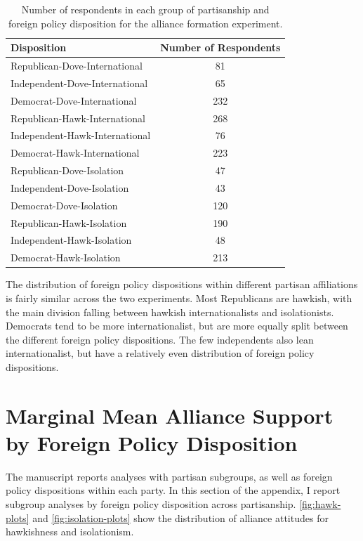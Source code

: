 \documentclass[12pt]{article}
\begin{document}
\begin{table}[htbp]
\centering
\begin{tabular}{lc}
  \hline
 Disposition  & Number of Respondents \\ 
  \hline
Republican-Dove-International &  81 \\ 
  Independent-Dove-International &  65 \\ 
  Democrat-Dove-International & 232 \\ 
  Republican-Hawk-International & 268 \\ 
  Independent-Hawk-International &  76 \\ 
  Democrat-Hawk-International & 223 \\ 
  Republican-Dove-Isolation &  47 \\ 
  Independent-Dove-Isolation &  43 \\ 
  Democrat-Dove-Isolation & 120 \\ 
  Republican-Hawk-Isolation & 190 \\ 
  Independent-Hawk-Isolation &  48 \\ 
  Democrat-Hawk-Isolation & 213 \\ 
   \hline
\end{tabular}
\caption{Number of respondents in each group of partisanship 
               and foreign policy disposition for the alliance formation experiment.} 
\label{tab:party-dispo-form}
\end{table}


The distribution of foreign policy dispositions within different partisan affiliations is fairly similar across the two experiments. 
Most Republicans are hawkish, with the main division falling between hawkish internationalists and isolationists. 
Democrats tend to be more internationalist, but are more equally split between the different foreign policy dispositions. 
The few independents also lean internationalist, but have a relatively even distribution of foreign policy dispositions. 



\section{Marginal Mean Alliance Support by Foreign Policy Disposition} 


The manuscript reports analyses with partisan subgroups, as well as foreign policy dispositions within each party. 
In this section of the appendix, I report subgroup analyses by foreign policy disposition across partisanship. 
\autoref{fig:hawk-plots} and \autoref{fig:isolation-plots} show the distribution of alliance attitudes for hawkishness and isolationism. 
\end{document}
